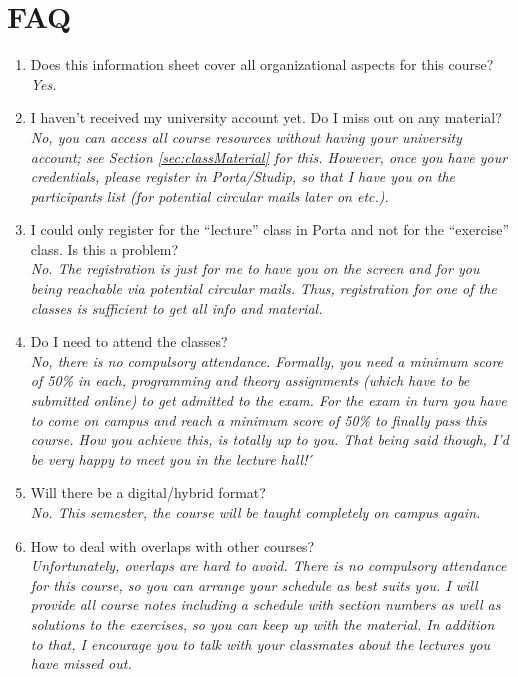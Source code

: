 \documentclass{article}
\begin{document}
\section{FAQ}
\begin{enumerate}
	\item Does this information sheet cover all organizational aspects for this course?\\
	\textit{Yes.}
		\item I haven't received my university account yet. Do I miss out on any material?\\
	\textit{No, you can access all course resources without having your university account; see Section \ref{sec:classMaterial} for this. However, once you have your credentials, please register in Porta/Studip, so that I have you on the participants list (for potential circular mails later on etc.).}
		\item I could only register for the ``lecture'' class in Porta and not for the ``exercise'' class. Is this a problem?\\
	\textit{No. The registration is just for me to have you on the screen and for you being reachable via potential circular mails. Thus, registration for one of the classes is sufficient to get all info and material.}
	\item Do I need to attend the classes?\\
		\textit{No, there is no compulsory attendance. Formally, you need a minimum score of 50\% in each, programming and theory assignments (which have to be submitted online) to get admitted to the exam. For the exam in turn you have to come on campus and reach a minimum score of 50\% to finally pass this course. How you achieve this, is totally up to you. That being said though, I'd be very happy to meet you in the lecture hall!}´
	\item Will there be a digital/hybrid format?\\
	\textit{No. This semester, the course will be taught completely on campus again.}
	\item How to deal with overlaps with other courses?\\
	\textit{Unfortunately, overlaps are hard to avoid. There is no compulsory attendance for this course, so you can arrange your schedule as best suits you. I will provide all course notes including a schedule with section numbers as well as solutions to the exercises, so you can keep up with the material. In addition to that, I encourage you to talk with your classmates about the lectures you have missed out.}

\end{enumerate}
\end{document}
